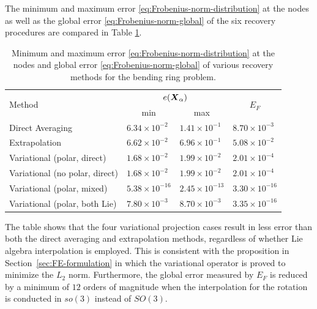 \documentclass[12pt]{article}
\begin{document}
The minimum and maximum error \eqref{eq:Frobenius-norm-distribution} at the
nodes as well as the global error \eqref{eq:Frobenius-norm-global} of the six
recovery procedures are compared in Table \ref{tab:ring-error-comparison}.

\begin{table}[htbp]
  \begin{center}
    \begin{tabular}{ l l l l }
      \toprule      
      \multirow{2}{*}{Method}
      &
      \multicolumn{2}{c}{$e({\boldsymbol{X}}_{\alpha})$}
      & 
      \multicolumn{1}{c}{\multirow{2}{*}{$E_{F}$}}
      \\
      &
      \multicolumn{1}{c}{min}
      &
      \multicolumn{1}{c}{max}
      &
      \\
      \hline
      Direct Averaging
      &
      $6.34 \times 10^{-2}$
      &
      $1.41 \times 10^{-1}$
      & 
      $8.70 \times 10^{-3}$
      \\
      Extrapolation   
      &
      $6.62 \times 10^{-2}$
      &
      $6.96 \times 10^{-1}$
      &
      $5.08 \times 10^{-2}$
      \\
      Variational (polar, direct)
      &
      $1.68 \times 10^{-2}$
      &
      $1.99 \times 10^{-2}$
      & 
      $2.01 \times 10^{-4}$
      \\
      Variational (no polar, direct)
      &
      $1.68 \times 10^{-2}$
      &
      $1.99 \times 10^{-2}$
      & 
      $2.01 \times 10^{-4}$
      \\
      Variational (polar, mixed)  
      &
      $5.38 \times 10^{-16}$
      &
      $2.45 \times 10^{-13}$
      & 
      $3.30 \times 10^{-16}$
      \\
      Variational (polar, both Lie)  
      &
      $7.80 \times 10^{-3}$
      &
      $8.70 \times 10^{-3}$
      & 
      $3.35 \times 10^{-16}$
      \\
      \bottomrule
    \end{tabular}
    \caption{Minimum and maximum error
      \eqref{eq:Frobenius-norm-distribution} at the nodes and global error
      \eqref{eq:Frobenius-norm-global} of various recovery methods for
      the bending ring problem.}
    \label{tab:ring-error-comparison}
  \end{center}
\end{table}

The table shows that the four variational projection cases result in less error
than both the direct averaging and extrapolation methods, regardless of whether
Lie algebra interpolation is employed. This is consistent with the proposition
in Section~\ref{sec:FE-formulation} in which the variational operator is proved
to minimize the $L_2$ norm. Furthermore, the global error measured by $E_{F}$ is
reduced by a minimum of $12$ orders of magnitude when the interpolation for the
rotation is conducted in $so(3)$ instead of $SO(3)$.
\end{document}
